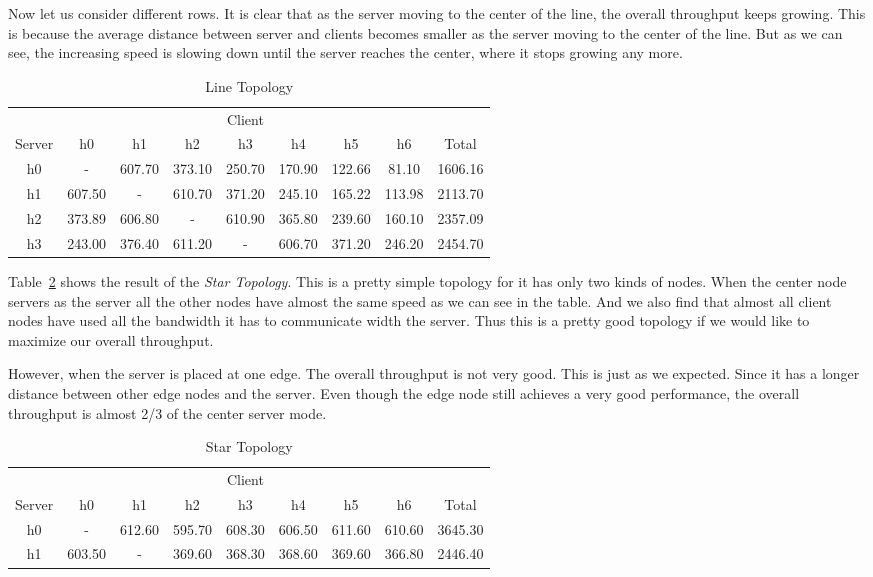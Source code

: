 Now let us consider different rows. It is clear that as the server moving to the center of 
the line, the overall throughput keeps growing. This is because the average distance between
server and clients becomes smaller as the server moving to the center of the line. But as we 
can see, the increasing speed is slowing down until the server reaches the center, where it 
stops growing any more.
\begin{table}
	\renewcommand{\arraystretch}{1.3}
	\caption{Line Topology}
	\label{table:line}
	\setlength\tabcolsep{4pt} %
	\centering
	\begin{tabular}{|c||c|c|c|c|c|c|c||c|}
		\hline
		       & \multicolumn{7}{c||}{Client} &  \\ \hhline{|~||-------||~|}
		Server & h0 & h1 & h2 & h3 & h4 & h5 & h6 & Total\\
\hline\hline
h0 &     -    &  607.70  &  373.10  &  250.70  &  170.90  &  122.66  &  81.10  & 1606.16 \\
\hline
h1 &  607.50  &     -    &  610.70  &  371.20  &  245.10  &  165.22  &  113.98  & 2113.70 \\
\hline
h2 &  373.89  &  606.80  &     -    &  610.90  &  365.80  &  239.60  &  160.10  & 2357.09 \\
\hline
h3 &  243.00  &  376.40  &  611.20  &     -    &  606.70  &  371.20  &  246.20  & 2454.70 \\
\hline
	\end{tabular}
\end{table}

Table~\ref{table:star} shows the result of the {\it Star Topology}. This is a pretty
simple topology for it has only two kinds of nodes. When the center node servers as the server 
all the other nodes have almost the same speed as we can see in the table. And we also find that 
almost all client nodes have used all the bandwidth it has to communicate width the server.
Thus this is a pretty good topology if we would like to maximize our overall throughput.

However, when the server is placed at one edge. The overall throughput is not very good. This is just as
we expected. Since it has a longer distance between other edge nodes and the server. Even though 
the edge node still achieves a very good performance, the overall throughput is almost 2/3 of the
center server mode.
\begin{table}
	\renewcommand{\arraystretch}{1.3}
	\caption{Star Topology}
	\label{table:star}
	\setlength\tabcolsep{4pt}
	\centering
	\begin{tabular}{|c||c|c|c|c|c|c|c||c|}
		\hline
		       & \multicolumn{7}{c||}{Client} &  \\ \hhline{|~||-------||~|}
		Server & h0 & h1 & h2 & h3 & h4 & h5 & h6 & Total\\
\hline\hline
h0 &     -    &  612.60  &  595.70  &  608.30  &  606.50  &  611.60  &  610.60  & 3645.30 \\
\hline
h1 &  603.50  &    -     &  369.60  &  368.30  &  368.60  &  369.60  &  366.80  & 2446.40 \\
\hline
	\end{tabular}
\end{table}

